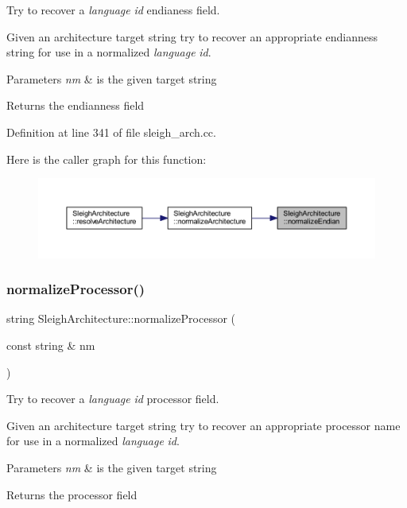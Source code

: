 Try to recover a {\itshape language} {\itshape id} endianess field. 

Given an architecture target string try to recover an appropriate endianness string for use in a normalized {\itshape language} {\itshape id}. 
\begin{DoxyParams}{Parameters}
{\em nm} & is the given target string \\
\hline
\end{DoxyParams}
\begin{DoxyReturn}{Returns}
the endianness field 
\end{DoxyReturn}


Definition at line 341 of file sleigh\+\_\+arch.\+cc.

Here is the caller graph for this function\+:
\nopagebreak
\begin{figure}[H]
\begin{center}
\leavevmode
\includegraphics[width=350pt]{class_sleigh_architecture_adfe35a4bb676b3676188d936eacccdb3_icgraph}
\end{center}
\end{figure}
\mbox{\label{class_sleigh_architecture_a01c91ee1ad3c886ddc13df95502489c1}} 
\subsubsection{\texorpdfstring{normalizeProcessor()}{normalizeProcessor()}}
{\footnotesize\ttfamily string Sleigh\+Architecture\+::normalize\+Processor (\begin{DoxyParamCaption}\item[{const string \&}]{nm }\end{DoxyParamCaption})\hspace{0.3cm}{\ttfamily [static]}}



Try to recover a {\itshape language} {\itshape id} processor field. 

Given an architecture target string try to recover an appropriate processor name for use in a normalized {\itshape language} {\itshape id}. 
\begin{DoxyParams}{Parameters}
{\em nm} & is the given target string \\
\hline
\end{DoxyParams}
\begin{DoxyReturn}{Returns}
the processor field 
\end{DoxyReturn}


